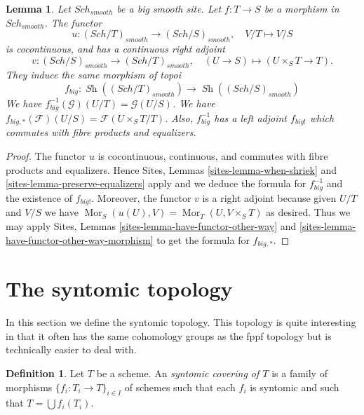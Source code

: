 \documentclass{stacks-project}
\theoremstyle{plain}
\newtheorem{lemma}[subsection]{Lemma}
\theoremstyle{definition}
\newtheorem{definition}[subsection]{Definition}
\theoremstyle{remark}
\numberwithin{equation}{subsection}
\def\Sch{\mathit{Sch}}
\def\Mor{\mathop{\mathrm{Mor}}\nolimits}
\def\Sh{\mathop{\mathit{Sh}}\nolimits}
\begin{document}
\begin{lemma}
\label{lemma-morphism-big-smooth}
Let $\Sch_{smooth}$ be a big smooth site.
Let $f : T \to S$ be a morphism in $\Sch_{smooth}$.
The functor
$$
u : (\Sch/T)_{smooth} \longrightarrow (\Sch/S)_{smooth},
\quad
V/T \longmapsto V/S
$$
is cocontinuous, and has a continuous right adjoint
$$
v : (\Sch/S)_{smooth} \longrightarrow (\Sch/T)_{smooth},
\quad
(U \to S) \longmapsto (U \times_S T \to T).
$$
They induce the same morphism of topoi
$$
f_{big} :
\Sh((\Sch/T)_{smooth})
\longrightarrow
\Sh((\Sch/S)_{smooth})
$$
We have $f_{big}^{-1}(\mathcal{G})(U/T) = \mathcal{G}(U/S)$.
We have $f_{big, *}(\mathcal{F})(U/S) = \mathcal{F}(U \times_S T/T)$.
Also, $f_{big}^{-1}$ has a left adjoint $f_{big!}$ which commutes with
fibre products and equalizers.
\end{lemma}

\begin{proof}
The functor $u$ is cocontinuous, continuous, and commutes with fibre products
and equalizers. Hence
Sites, Lemmas \ref{sites-lemma-when-shriek} and
\ref{sites-lemma-preserve-equalizers}
apply and we deduce the formula
for $f_{big}^{-1}$ and the existence of $f_{big!}$. Moreover,
the functor $v$ is a right adjoint because given $U/T$ and $V/S$
we have $\Mor_S(u(U), V) = \Mor_T(U, V \times_S T)$
as desired. Thus we may apply
Sites, Lemmas \ref{sites-lemma-have-functor-other-way} and
\ref{sites-lemma-have-functor-other-way-morphism} to get the
formula for $f_{big, *}$.
\end{proof}











\section{The syntomic topology}
\label{section-syntomic}

\noindent
In this section we define the syntomic topology.
This topology is quite interesting in that it often
has the same cohomology groups as the fppf topology
but is technically easier to deal with.

\begin{definition}
\label{definition-syntomic-covering}
Let $T$ be a scheme. An {\it syntomic covering of $T$} is a family
of morphisms $\{f_i : T_i \to T\}_{i \in I}$ of schemes
such that each $f_i$ is syntomic and such
that $T = \bigcup f_i(T_i)$.
\end{definition}
\end{document}
